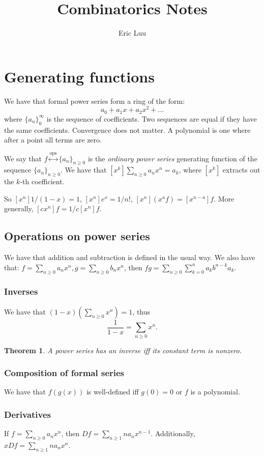 \documentclass[]{article}
\title{Combinatorics Notes}
\author{Eric Luu}
\newtheorem{theorem}{Theorem}
\theoremstyle{definition}
\numberwithin{theorem}{section}
\numberwithin{equation}{section}
\newcommand{\ops}{\overset{\text{ops}}{\leftrightarrow}}
\begin{document}
\maketitle
\section{Generating functions}
We have that formal power series form a ring of the form:
\begin{equation}
	a_0 + a_1x + a_2 x^2 + ...
\end{equation}
where $\lbrace a_n \rbrace_0^\infty$ is the sequence of coefficients. Two sequences are equal if they have the same coefficients. Convergence does not matter. A polynomial is one where after a point all terms are zero.

We say that $f \ops \lbrace a_n \rbrace_{n \geq 0} $ is the \textit{ordinary power series} generating function of the sequence $\lbrace a_n \rbrace_{n \geq 0}$. We have that $[x^k] \sum_{n \geq 0} a_n x^n = a_k$, where $[x^k]$ extracts out the $k$-th coefficient.

So $[x^n]1/(1-x) = 1$, $[x^n] e^x = 1/n!$, $[x^n](x^a f) = [x^{n-a}] f$. More generally, $[cx^n] f = 1/c [x^n] f$.
\subsection{Operations on power series}
We have that addition and subtraction is defined in the usual way. We also have that:
$f = \sum_{n \geq 0} a_n x^n, g = \sum_{n \geq 0} b_n x^n$, then $fg = \sum_{n \geq 0} \sum_{k=0}^{n} a_k b^{n-k} a_k$.  
\subsubsection{Inverses}
We have that $(1-x)(\sum_{n \geq 0}x^n) = 1$, thus
\begin{equation}
	\frac{1}{1-x} = \sum_{n \geq 0} x^n.
\end{equation}
\begin{theorem}
	A power series has an inverse iff its constant term is nonzero. 
\end{theorem}
\subsubsection{Composition of formal series}
We have that $f(g(x))$ is well-defined iff $g(0) = 0$ or $f$ is a polynomial. 

\subsubsection{Derivatives}
If $f = \sum_{n \geq 0} a_n x^n$, then $Df = \sum_{n \geq 1} na_nx^{n-1}$. 
Additionally, $xD f = \sum_{n \geq 1} na_nx^n$.
\end{document}
